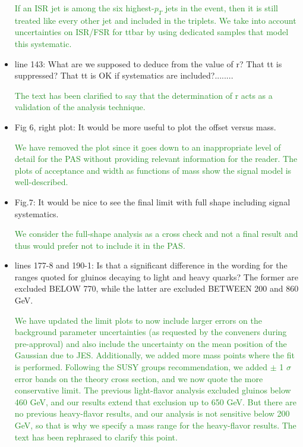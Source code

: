\documentclass[paper=a4, fontsize=11pt]{scrartcl}
\begin{document}
\begin{itemize}
\textcolor{ForestGreen}{If an ISR jet is among the six highest-$p_T$ jets in the event, then it is still treated like every other jet and included
in the triplets. We take into account uncertainties on ISR/FSR for ttbar by using dedicated samples that model this systematic.}\\


\item line 143: What are we supposed to deduce from the value of r? That tt is suppressed? That tt is OK if systematics are included?........

\textcolor{ForestGreen}{The text has been clarified to say that the determination of r acts as a validation of the analysis technique.}\\

\item Fig 6, right plot: It would be more useful to plot the offset versus mass.

\textcolor{ForestGreen}{We have removed the plot since it goes down to an
inappropriate level of detail for the PAS without providing relevant
information for the reader. The plots of acceptance and width
as functions of mass show the signal model is well-described.}\\

\item Fig.7: It would be nice to see the final limit with full shape including signal systematics.

\textcolor{ForestGreen}{We consider the full-shape analysis as a cross check and not a final
result and thus would prefer not to include it in the PAS.}\\

\item lines 177-8 and 190-1: Is that a significant difference in the wording for the ranges quoted for gluinos decaying to light and heavy quarks? The former are excluded BELOW 770, while the latter are excluded BETWEEN 200 and 860 GeV.

\textcolor{ForestGreen}{We have updated the limit plots to now include larger errors on the background parameter uncertainties (as requested by the conveners during pre-approval) and also include the uncertainty on the mean position of the Gaussian due to JES. Additionally,
we added more mass points where the fit is performed. Following the SUSY groups recommendation, we added $\pm$ 1 $\sigma$ error bands on the theory cross section, and we now quote the more conservative limit. The previous light-flavor analysis excluded gluinos below 460 GeV, and our
results extend that exclusion up to 650 GeV. But there are no previous heavy-flavor results,
and our analysis is not sensitive below 200 GeV, so that is why we specify a mass range for
the heavy-flavor results. The text has been rephrased to clarify this point.}\\

\end{itemize}
\end{document}
